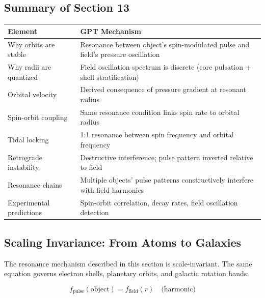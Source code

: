 \documentclass[12pt, a4paper]{article}
\begin{document}
\subsection{Summary of Section 13}
\label{subsec:summary_13}

\begin{center}
\begin{tabular}{|p{4cm}|p{10cm}|}
\hline
\textbf{Element} & \textbf{GPT Mechanism} \\
\hline
Why orbits are stable & Resonance between object's spin-modulated pulse and field's pressure oscillation \\
\hline
Why radii are quantized & Field oscillation spectrum is discrete (core pulsation + shell stratification) \\
\hline
Orbital velocity & Derived consequence of pressure gradient at resonant radius \\
\hline
Spin-orbit coupling & Same resonance condition links spin rate to orbital radius \\
\hline
Tidal locking & 1:1 resonance between spin frequency and orbital frequency \\
\hline
Retrograde instability & Destructive interference; pulse pattern inverted relative to field \\
\hline
Resonance chains & Multiple objects' pulse patterns constructively interfere with field harmonics \\
\hline
Experimental predictions & Spin-orbit correlation, decay rates, field oscillation detection \\
\hline
\end{tabular}
\end{center}

\subsection{Scaling Invariance: From Atoms to Galaxies}
\label{subsec:scaling_invariance}

The resonance mechanism described in this section is scale-invariant. The same equation governs electron shells, planetary orbits, and galactic rotation bands:

\[
f_{\text{pulse}}(\text{object}) = f_{\text{field}}(r) \quad \text{(harmonic)}
\]
\end{document}
